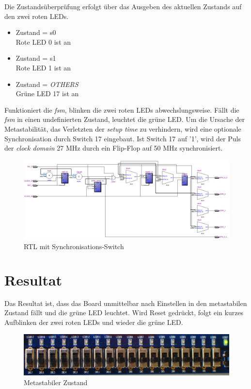 Die Zustandsüberprüfung erfolgt über das Ausgeben des aktuellen Zustands auf den zwei roten LEDs. 

\begin{itemize}
	\item Zustand = s0\\
	Rote LED 0 ist an
	\item Zustand = s1\\
	 Rote LED 1 ist an
	\item Zustand = \textit{OTHERS}\\
	 Grüne LED 17 ist an\\
\end{itemize}

Funktioniert die \textit{fsm}, blinken die zwei roten LEDs abwechslungsweise. Fällt die \textit{fsm} in einen undefinierten Zustand, leuchtet die grüne LED. Um die Ursache der Metastabilität, das Verletzten der \textit{setup time} zu verhindern, wird eine optionale Synchronisation durch Switch 17 eingebaut. Ist Switch 17  auf '1', wird der Puls der \textit{clock domain} 27 MHz durch ein Flip-Flop auf 50 MHz synchronisiert.

\begin{figure}[H]
	\includegraphics[width=1\textwidth]{images/metastability/RtL_metastaibility.png}
	\caption{RTL mit Synchronisations-Switch}
	\label{fig.metastabil.RtL}
\end{figure}

\newpage
\section{Resultat}\label{sect.meatastabil_proozieren}

Das Resultat ist, dass das Board unmittelbar nach Einstellen in den metastabilen Zustand fällt und die grüne LED leuchtet. Wird Reset gedrückt, folgt ein kurzes Aufblinken der zwei roten LEDs und wieder die grüne LED.

\begin{figure}[H]
	\includegraphics[width=1\textwidth]{images/metastability/metastabil.JPG}
	\caption{Metastabiler Zustand}
	\label{fig.metastabil.Ergebnis_Boardasynchron}
\end{figure}

